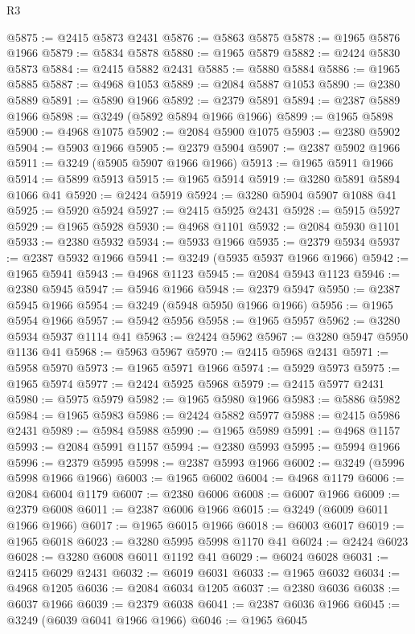 \begin{lexlean}{R3}
\begin{coremodule}
@5875 := @2415 @5873 @2431
@5876 := @5863 @5875
@5878 := @1965 @5876 @1966
@5879 := @5834 @5878
@5880 := @1965 @5879
@5882 := @2424 @5830 @5873
@5884 := @2415 @5882 @2431
@5885 := @5880 @5884
@5886 := @1965 @5885
@5887 := @4968 @1053
@5889 := @2084 @5887 @1053
@5890 := @2380 @5889
@5891 := @5890 @1966
@5892 := @2379 @5891
@5894 := @2387 @5889 @1966
@5898 := @3249 (@5892 @5894 @1966 @1966)
@5899 := @1965 @5898
@5900 := @4968 @1075
@5902 := @2084 @5900 @1075
@5903 := @2380 @5902
@5904 := @5903 @1966
@5905 := @2379 @5904
@5907 := @2387 @5902 @1966
@5911 := @3249 (@5905 @5907 @1966 @1966)
@5913 := @1965 @5911 @1966
@5914 := @5899 @5913
@5915 := @1965 @5914
@5919 := @3280 @5891 @5894 @1066 @41
@5920 := @2424 @5919
@5924 := @3280 @5904 @5907 @1088 @41
@5925 := @5920 @5924
@5927 := @2415 @5925 @2431
@5928 := @5915 @5927
@5929 := @1965 @5928
@5930 := @4968 @1101
@5932 := @2084 @5930 @1101
@5933 := @2380 @5932
@5934 := @5933 @1966
@5935 := @2379 @5934
@5937 := @2387 @5932 @1966
@5941 := @3249 (@5935 @5937 @1966 @1966)
@5942 := @1965 @5941
@5943 := @4968 @1123
@5945 := @2084 @5943 @1123
@5946 := @2380 @5945
@5947 := @5946 @1966
@5948 := @2379 @5947
@5950 := @2387 @5945 @1966
@5954 := @3249 (@5948 @5950 @1966 @1966)
@5956 := @1965 @5954 @1966
@5957 := @5942 @5956
@5958 := @1965 @5957
@5962 := @3280 @5934 @5937 @1114 @41
@5963 := @2424 @5962
@5967 := @3280 @5947 @5950 @1136 @41
@5968 := @5963 @5967
@5970 := @2415 @5968 @2431
@5971 := @5958 @5970
@5973 := @1965 @5971 @1966
@5974 := @5929 @5973
@5975 := @1965 @5974
@5977 := @2424 @5925 @5968
@5979 := @2415 @5977 @2431
@5980 := @5975 @5979
@5982 := @1965 @5980 @1966
@5983 := @5886 @5982
@5984 := @1965 @5983
@5986 := @2424 @5882 @5977
@5988 := @2415 @5986 @2431
@5989 := @5984 @5988
@5990 := @1965 @5989
@5991 := @4968 @1157
@5993 := @2084 @5991 @1157
@5994 := @2380 @5993
@5995 := @5994 @1966
@5996 := @2379 @5995
@5998 := @2387 @5993 @1966
@6002 := @3249 (@5996 @5998 @1966 @1966)
@6003 := @1965 @6002
@6004 := @4968 @1179
@6006 := @2084 @6004 @1179
@6007 := @2380 @6006
@6008 := @6007 @1966
@6009 := @2379 @6008
@6011 := @2387 @6006 @1966
@6015 := @3249 (@6009 @6011 @1966 @1966)
@6017 := @1965 @6015 @1966
@6018 := @6003 @6017
@6019 := @1965 @6018
@6023 := @3280 @5995 @5998 @1170 @41
@6024 := @2424 @6023
@6028 := @3280 @6008 @6011 @1192 @41
@6029 := @6024 @6028
@6031 := @2415 @6029 @2431
@6032 := @6019 @6031
@6033 := @1965 @6032
@6034 := @4968 @1205
@6036 := @2084 @6034 @1205
@6037 := @2380 @6036
@6038 := @6037 @1966
@6039 := @2379 @6038
@6041 := @2387 @6036 @1966
@6045 := @3249 (@6039 @6041 @1966 @1966)
@6046 := @1965 @6045

\end{coremodule}
\end{lexlean}
